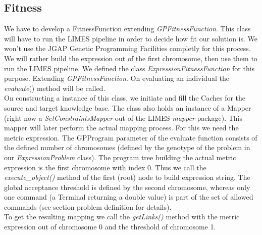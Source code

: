 \documentclass{article}%
\begin{document}
\subsection{Fitness}
We have to develop a FitnessFunction extending \textit{GPFitnessFunction}. This class will have to run the LIMES pipeline in order to decide how fit our solution is.
We won't use the JGAP Genetic Programming Facilities completly for this process. We will rather build the expression out of the first chromosome, then use them to run the LIMES pipeline. We defined the class \textit{ExpressionFitnessFunction} for this purpose. Extending \textit{GPFitnessFunction}. On evaluating an individual the \textit{evaluate}() method will be called.\\On constructing a instance of this class, we initiate and fill the Caches for the source and target knowledge base. The class also holds an instance of a Mapper (right now a \textit{SetConstraintsMapper} out of the LIMES \textit{mapper} package). This mapper will later perform the actual mapping process. For this we need the metric expression.
The GPProgram parameter of the evaluate function consists of the defined number of chromosomes (defined by the genotype of the problem in our \textit{ExpressionProblem} class). The program tree building the actual metric expression is the first chromosome with index 0. Thus we call the \textit{execute\_object()} method of the first (root) node to build expression string. The global acceptance threshold is defined by the second chromosome, whereas only one command (a Terminal returning a double value) is part of the set of allowed commands (see section problem definition for details).\\
To get the resulting mapping we call the \textit{getLinks()} method with the metric expression out of chromosome 0 and the threshold of chromosome 1.

% 


\end{document}
